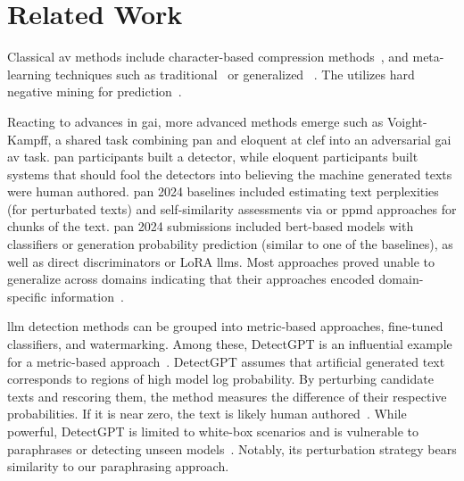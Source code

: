\chapter{Related Work}
\label{chap:related_work}




Classical \ac{av} methods include character-based compression methods~\citep{tyo_state_2022,neal_surveying_2018}, and meta-learning techniques such as traditional~\citep{koppel_authorship_2004,koppel_authorship_2011} or generalized \unmasking{}~\citep{bevendorff_generalizing_2019,bevendorff_divergence_based_2020}.
The \impAppr{} utilizes hard negative mining for prediction~\citep{koppel_determining_2014}.

Reacting to advances in \ac{gai}, more advanced methods emerge such as Voight-Kampff, a shared task combining \acs{pan} and \acs{eloquent} at \acs{clef} into an adversarial \ac{gai} \ac{av} task.
\acs{pan} participants built a detector, while \acs{eloquent} participants built systems that should fool the detectors into believing the machine generated texts were human authored.
\acs{pan} 2024 baselines included estimating text perplexities (for perturbated texts) and self-similarity assessments via \unmasking{} or \ac{ppmd} approaches for chunks of the text.
\acs{pan} 2024 submissions included \acs{bert}-based models with classifiers or generation probability prediction (similar to one of the baselines), as well as direct discriminators or LoRA \acp{llm}.
Most approaches proved unable to generalize across domains indicating that their approaches encoded domain-specific information~\citep{bevendorff_overview_2024}.

\Ac{llm} detection methods can be grouped into metric-based approaches, fine-tuned classifiers, and watermarking. 
Among these, DetectGPT is an influential example for a metric-based approach~\citep{wang_stumbling_2024}.
DetectGPT assumes that artificial generated text corresponds to regions of high model log probability. 
By perturbing candidate texts and rescoring them, the method measures the difference of their respective probabilities.
If it is near zero, the text is likely human authored~\citep{mitchell_detectgpt_2023}. 
While powerful, DetectGPT is limited to white-box scenarios %
and is vulnerable to paraphrases or detecting unseen models~\citep{Wu_ODD_challenges_2025}.
Notably, its perturbation strategy bears similarity to our paraphrasing approach.

